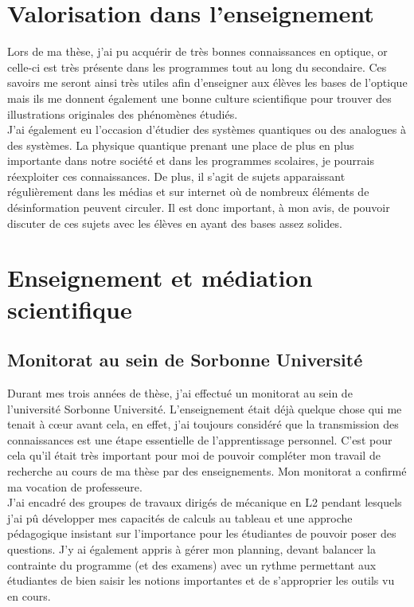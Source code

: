 \documentclass[a4paper,11pt]{article} %
\newcommand{\pointmedian}{\fontfamily{cmr}\selectfont\textperiodcentered}
\begin{document}
	\section{Valorisation dans l'enseignement}
	Lors de ma thèse, j'ai pu acquérir de très bonnes connaissances en optique, or celle-ci est très présente dans les programmes tout au long du secondaire. Ces savoirs me seront ainsi très utiles afin d'enseigner aux élèves les bases de l'optique mais ils me donnent également une bonne culture scientifique pour trouver des illustrations originales des phénomènes étudiés.\\
	
	J'ai également eu l'occasion d'étudier des systèmes quantiques ou des analogues à des systèmes. La physique quantique prenant une place de plus en plus importante dans notre société et dans les programmes scolaires, je pourrais réexploiter ces connaissances. De plus, il s'agit de sujets apparaissant régulièrement dans les médias et sur internet où de nombreux éléments de désinformation peuvent circuler. Il est donc important, à mon avis, de pouvoir discuter de ces sujets avec les élèves en ayant des bases assez solides.
	
	
	\section{Enseignement et médiation scientifique}
	\subsection{Monitorat au sein de Sorbonne Université}
	Durant mes trois années de thèse, j'ai effectué un monitorat au sein de l'université Sorbonne Université. L'enseignement était déjà quelque chose qui me tenait à cœur avant cela, en effet, j'ai toujours considéré que la transmission des connaissances est une étape essentielle de l'apprentissage personnel. C'est pour cela qu'il était très important pour moi de pouvoir compléter mon travail de recherche au cours de ma thèse par des enseignements. Mon monitorat a confirmé ma vocation de professeure.\\ 
	
	J'ai encadré des groupes de travaux dirigés de mécanique en L2 pendant lesquels j'ai pû développer mes capacités de calculs au tableau et une approche pédagogique insistant sur l'importance pour les étudiant\pointmedian es de pouvoir poser des questions. J'y ai également appris à gérer mon planning, devant balancer la contrainte du programme (et des examens) avec un rythme permettant aux étudiant\pointmedian es de bien saisir les notions importantes et de s'approprier les outils vu en cours.\\
	
\end{document}

